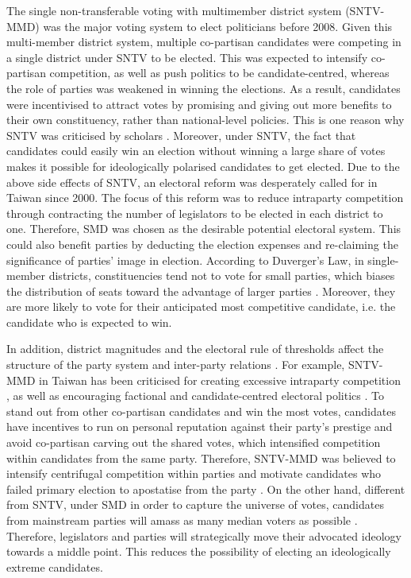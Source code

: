 The single non-transferable voting with multimember district system (SNTV-MMD) was the major voting system to elect politicians before 2008. Given this multi-member district system, multiple co-partisan candidates were competing in a single district under SNTV to be elected. This was expected to intensify co-partisan competition, as well as push politics to be candidate-centred, whereas the role of parties was weakened in winning the elections. As a result, candidates were incentivised to attract votes by promising and giving out more benefits to their own constituency, rather than national-level policies. This is one reason why SNTV was criticised by scholars \citep[e.g.][]{Wu2003, Batto2016}. Moreover, under SNTV, the fact that candidates could easily win an election without winning a large share of votes makes it possible for ideologically polarised candidates to get elected. Due to the above side effects of SNTV, an electoral reform was desperately called for in Taiwan since 2000. The focus of this reform was to reduce intraparty competition through contracting the number of legislators to be elected in each district to one. Therefore, SMD was chosen as the desirable potential electoral system. This could also benefit parties by deducting the election expenses and re-claiming the significance of parties' image in election. According to Duverger's Law, in single-member districts, constituencies tend not to vote for small parties, which biases the distribution of seats toward the advantage of larger parties \citep[][]{Reed2001, Duverger1954}. Moreover, they are more likely to vote for their anticipated most competitive candidate, i.e. the candidate who is expected to win. 

In addition, district magnitudes and the electoral rule of thresholds affect the structure of the party system and inter-party relations \citep{Duverger1954}. For example, SNTV-MMD in Taiwan has been criticised for creating excessive intraparty competition \citep[e.g.,][]{Hirano2006}, as well as encouraging factional and candidate-centred electoral politics \citep{Batto2016, Wu2003, Cox1993b, Cox1996b, Cox1997a}. To stand out from other co-partisan candidates and win the most votes, candidates have incentives to run on personal reputation against their party's prestige and avoid co-partisan carving out the shared votes, which intensified competition within candidates from the same party. Therefore, SNTV-MMD was believed to intensify centrifugal competition \citep{Cox1990, Carey1995} within parties and motivate candidates who failed primary election to apostatise from the party \citep{Wu2003}. 
On the other hand, different from SNTV, under SMD in order to capture the universe of votes, candidates from mainstream parties will amass as many median voters as possible \citep{Downs1957, Duverger1954, Magar1998, Merrill2002}.  Therefore, legislators and parties will strategically move their advocated ideology towards a middle point. This reduces the possibility of electing an ideologically extreme candidates. 


